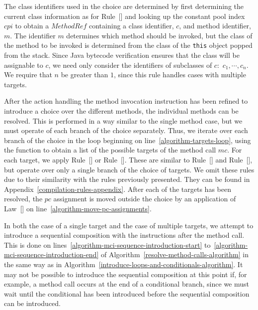 The class identifiers used in the choice are determined by first
determining the current class information as for
Rule~[] and looking up the constant
pool index $cpi$ to obtain a $MethodRef$ containing a class
identifier, $c$, and method identifier, $m$.
The identifier $m$ determines which method should be invoked, but the
class of the method to be invoked is determined from the class of the
\texttt{this} object popped from the stack.
Since Java bytecode verification ensures that the class will be
assignable to $c$, we need only consider the identifiers of subclasses
of $c$:~$c_1, \cdots , c_n$.
We require that $n$ be greater than $1$, since this rule handles cases
with multiple targets.

After the action handling the method invocation instruction has been
refined to introduce a choice over the different methods, the
individual methods can be resolved.
This is performed in a way similar to the single method case, but we
must operate of each branch of the choice separately.
Thus, we iterate over each branch of the choice in the loop beginning
on line~\ref{algorithm-targets-loop}, using the function
 to obtain a list of the possible targets of the
method call $mc$.
For each target, we apply
Rule~[] or
Rule~[].
These are similar to Rule~[] and
Rule~[], but operate over only a
single branch of the choice of targets.
We omit these rules due to their similarity with the rules previously
presented.
They can be found in Appendix~\ref{compilation-rules-appendix}.
After each of the targets has been resolved, the $pc$ assignment is
moved outside the choice by an application of
Law~[] on
line~\ref{algorithm-move-pc-assignments}.

In both the case of a single target and the case of multiple targets,
we attempt to introduce a sequential composition with the instructions
after the method call.
This is done on lines~\ref{algorithm-mci-sequence-introduction-start}
to~\ref{algorithm-mci-sequence-introduction-end} of
Algorithm~\ref{resolve-method-calls-algorithm} in the same way as in
Algorithm~\ref{introduce-loops-and-conditionals-algorithm}.
It may not be possible to introduce the sequential composition at this
point if, for example, a method call occurs at the end of a
conditional branch, since we must wait until the conditional has been
introduced before the sequential composition can be introduced.

